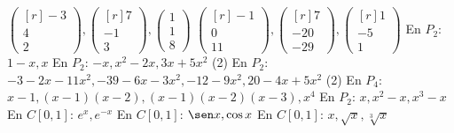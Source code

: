 \begin{tasks}[
    start=68,
    style=enumerate,
    item-indent = 0.9cm,
    label-offset = 3mm,
    ]
    \task $\begin{pmatrix*}[r]-3 \\ 4 \\ 2\end{pmatrix*},\begin{pmatrix*}[r]7 \\ -1 \\ 3\end{pmatrix*},\begin{pmatrix*}1 \\ 1 \\ 8\end{pmatrix*}$
    \task $\begin{pmatrix*}[r]-1 \\ 0 \\ 11\end{pmatrix*},\begin{pmatrix*}[r]7 \\ -20 \\ -29\end{pmatrix*},\begin{pmatrix*}[r]1 \\ -5 \\ 1\end{pmatrix*}$
    \task En $P_{2}$: $1-x, x$
    \task En $P_{2}$: $-x, x^{2}-2 x, 3 x+5 x^{2}$
    \task*(2) En $P_2$: $-3-2 x-11 x^{2},-39-6 x-3 x^{2},-12-9 x^{2}, 20-4 x+5 x^{2}$
    \task*(2) En $P_{4}$: $x-1,(x-1)(x-2),(x-1)(x-2)(x-3), x^{4}$
    \task En $P_{2}$: $x, x^{2}-x, x^{3}-x$
    \task En $C[0,1]$: $e^{x}, e^{-x}$
    \task En $C[0,1]$: $\sen x, \cos x$
    \task En $C[0,1]$: $x, \sqrt{x}, \sqrt[3]{x}$
\end{tasks}
